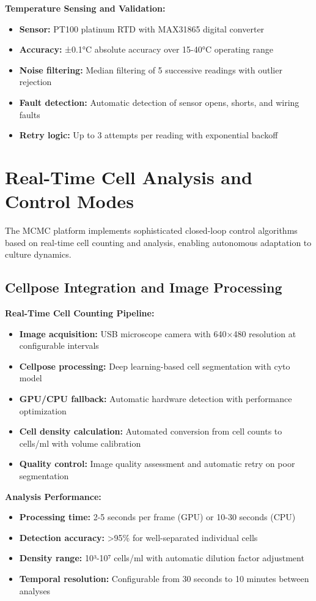 \textbf{Temperature Sensing and Validation:}
\begin{itemize}
\item \textbf{Sensor:} PT100 platinum RTD with MAX31865 digital converter
\item \textbf{Accuracy:} ±0.1°C absolute accuracy over 15-40°C operating range
\item \textbf{Noise filtering:} Median filtering of 5 successive readings with outlier rejection
\item \textbf{Fault detection:} Automatic detection of sensor opens, shorts, and wiring faults
\item \textbf{Retry logic:} Up to 3 attempts per reading with exponential backoff
\end{itemize}

\section{Real-Time Cell Analysis and Control Modes}

The MCMC platform implements sophisticated closed-loop control algorithms based on real-time cell counting and analysis, enabling autonomous adaptation to culture dynamics.

\subsection{Cellpose Integration and Image Processing}

\textbf{Real-Time Cell Counting Pipeline:}
\begin{itemize}
\item \textbf{Image acquisition:} USB microscope camera with 640×480 resolution at configurable intervals
\item \textbf{Cellpose processing:} Deep learning-based cell segmentation with cyto model
\item \textbf{GPU/CPU fallback:} Automatic hardware detection with performance optimization
\item \textbf{Cell density calculation:} Automated conversion from cell counts to cells/ml with volume calibration
\item \textbf{Quality control:} Image quality assessment and automatic retry on poor segmentation
\end{itemize}

\textbf{Analysis Performance:}
\begin{itemize}
\item \textbf{Processing time:} 2-5 seconds per frame (GPU) or 10-30 seconds (CPU)
\item \textbf{Detection accuracy:} >95\% for well-separated individual cells
\item \textbf{Density range:} 10³-10⁷ cells/ml with automatic dilution factor adjustment
\item \textbf{Temporal resolution:} Configurable from 30 seconds to 10 minutes between analyses
\end{itemize}

